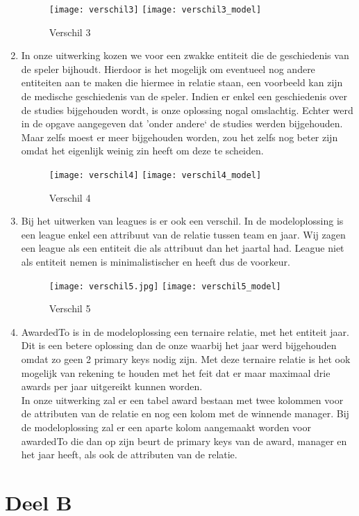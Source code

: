 \documentclass[a4paper,kulak]{kulakarticle}
\begin{document}
\begin{enumerate}
		\begin{figure}[!htb]
			\centering
			\texttt{[image: verschil3]}
			\texttt{[image: verschil3\_model]}
			\caption{Verschil 3}
			\label{fig:verschil3}
		\end{figure}
	\item In onze uitwerking kozen we voor een zwakke entiteit die de geschiedenis van de speler bijhoudt. Hierdoor is het mogelijk om eventueel nog andere entiteiten aan te maken die hiermee in relatie staan, een voorbeeld kan zijn de medische geschiedenis van de speler. Indien er enkel een geschiedenis over de studies bijgehouden wordt, is onze oplossing nogal omslachtig. Echter werd in de opgave aangegeven dat 'onder andere` de studies werden bijgehouden. Maar zelfs moest er meer bijgehouden worden, zou het zelfs nog beter zijn omdat het eigenlijk weinig zin heeft om deze te scheiden. \\
	
	
	
		\begin{figure}[!htb]
			\centering
			\texttt{[image: verschil4]}
			\texttt{[image: verschil4\_model]}
			\caption{Verschil 4}
			\label{fig:verschil4}
		\end{figure}
	\item Bij het uitwerken van leagues is er ook een verschil. In de modeloplossing is een league enkel een attribuut van de relatie tussen team en jaar. Wij zagen een league als een entiteit die als attribuut dan het jaartal had. 
	League niet als entiteit nemen is minimalistischer en heeft dus de voorkeur.

\begin{figure}[!htb]
	\centering
	\texttt{[image: verschil5.jpg]}
	\texttt{[image: verschil5\_model]}
	\caption{Verschil 5}
	\label{fig:verschil5}
\end{figure}

	\item AwardedTo is in de modeloplossing een ternaire relatie, met het entiteit jaar. Dit is een betere oplossing dan de onze waarbij het jaar werd bijgehouden omdat zo geen 2 primary keys nodig zijn. Met deze ternaire relatie is het ook mogelijk van rekening te houden met het feit dat er maar maximaal drie awards per jaar uitgereikt kunnen worden. \\
	In onze uitwerking zal er een tabel award bestaan met twee kolommen voor de attributen van de relatie en nog een kolom met de winnende manager. Bij de modeloplossing zal er een aparte kolom aangemaakt worden voor awardedTo die dan op zijn beurt de primary keys van de award, manager en het jaar heeft, als ook de attributen van de relatie. 
	
	
	
\end{enumerate}

\section{Deel B}
\end{document}
